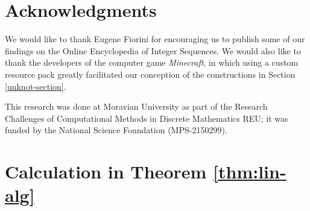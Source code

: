 \documentclass{article}
\begin{document}
\section*{Acknowledgments}
We would like to thank Eugene Fiorini for encouraging us to publish some of our findings on the Online Encyclopedia of Integer Sequences.
We would also like to thank the developers of the computer game \emph{Minecraft}, in which using a custom resource pack greatly facilitated our conception of the constructions in Section \ref{unknot-section}.

This research was done at Moravian University as part of the Research Challenges of Computational Methods in Discrete Mathematics REU; it was funded by the National Science Foundation (MPS-2150299).



\pagebreak

\appendix

\renewcommand{\thefigure}{\thesection.\arabic{figure}}
\renewcommand{\theHfigure}{\thesection.\arabic{figure}}
\setcounter{figure}{0}

\renewcommand{\thetable}{\thesection.\arabic{table}}
\renewcommand{\theHtable}{\thesection.\arabic{table}}
\setcounter{table}{0}
    
\section{Calculation in Theorem \ref{thm:lin-alg}}\label{app:lin-alg-details}
\end{document}
